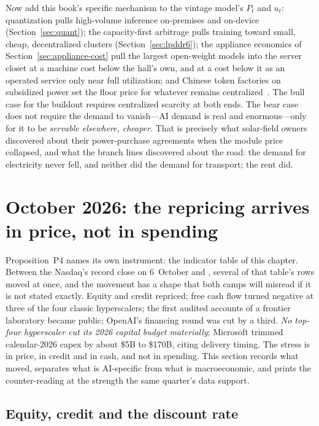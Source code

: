 Now add this book's specific mechanism to the vintage model's $P_t$ and $u_t$: quantization pulls high-volume inference on-premises and on-device (Section~\ref{sec:quant}); the capacity-first arbitrage pulls training toward small, cheap, decentralized clusters (Section~\ref{sec:lpddr6}); the appliance economics of Section~\ref{sec:appliance-cost} pull the largest open-weight models into the server closet at a machine cost below the hall's own, and at a cost below it as an operated service only near full utilization; and Chinese token factories on subsidized power set the floor price for whatever remains centralized~\cite{token-econ}. The bull case for the buildout requires centralized scarcity at both ends. The bear case does not require the demand to vanish---AI demand is real and enormous---only for it to be \emph{servable elsewhere, cheaper}. That is precisely what solar-field owners discovered about their power-purchase agreements when the module price collapsed, and what the branch lines discovered about the road: the demand for electricity never fell, and neither did the demand for transport; the rent did.

\section{October 2026: the repricing arrives in price, not in spending}
\label{sec:cap-october}

Proposition~P4 names its own instrument: the indicator table of this chapter. Between the Nasdaq's record close on 6~October and \datafreeze, several of that table's rows moved at once, and the movement has a shape that both camps will misread if it is not stated exactly. Equity and credit repriced; free cash flow turned negative at three of the four classic hyperscalers; the first audited accounts of a frontier laboratory became public; OpenAI's financing round was cut by a third. \emph{No top-four hyperscaler cut its 2026 capital budget materially}; Microsoft trimmed calendar-2026 capex by about \$5B to \$170B, citing delivery timing. The stress is in price, in credit and in cash, and not in spending. This section records what moved, separates what is AI-specific from what is macroeconomic, and prints the counter-reading at the strength the same quarter's data support.

\subsection{Equity, credit and the discount rate}
\label{sec:cap-oct-markets}


